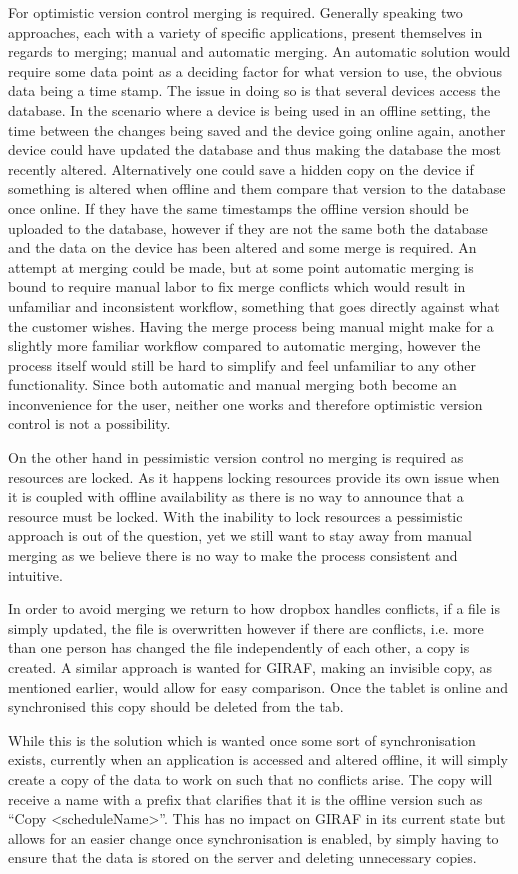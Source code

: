 For optimistic version control merging is required. 
Generally speaking two approaches, each with a variety of specific applications, present themselves in regards to merging; manual and automatic merging.
An automatic solution would require some data point as a deciding factor for what version to use, the obvious data being a time stamp.
The issue in doing so is that several devices access the database.
In the scenario where a device is being used in an offline setting, the time between the changes being saved and the device going online again, another device could have updated the database and thus making the database the most recently altered.
Alternatively one could save a hidden copy on the device if something is altered when offline and them compare that version to the database once online. 
If they have the same timestamps the offline version should be uploaded to the database, however if they are not the same both the database and the data on the device has been altered and some merge is required.
An attempt at merging could be made, but at some point automatic merging is bound to require manual labor to fix merge conflicts which would result in unfamiliar and inconsistent workflow, something that goes directly against what the customer wishes.
Having the merge process being manual might make for a slightly more familiar workflow compared to automatic merging, however the process itself would still be hard to simplify and feel unfamiliar to any other functionality.
Since both automatic and manual merging both become an inconvenience for the user, neither one works and therefore optimistic version control is not a possibility.

\bigskip
On the other hand in pessimistic version control no merging is required as resources are locked.
As it happens locking resources provide its own issue when it is coupled with offline availability as there is no way to announce that a resource must be locked.
With the inability to lock resources a pessimistic approach is out of the question, yet we still want to stay away from manual merging as we believe there is no way to make the process consistent and intuitive.

In order to avoid merging we return to how dropbox handles conflicts, if a file is simply updated, the file is overwritten however if there are conflicts, i.e. more than one person has changed the file independently of each other, a copy is created.
A similar approach is wanted for GIRAF, making an invisible copy, as mentioned earlier, would allow for easy comparison.
Once the tablet is online and synchronised this copy should be deleted from the tab.

\bigskip
While this is the solution which is wanted once some sort of synchronisation exists, currently when an application is accessed and altered offline, it will simply create a copy of the data to work on such that no conflicts arise.
The copy will receive a name with a prefix that clarifies that it is the offline version such as \enquote{Copy <scheduleName>}.
This has no impact on GIRAF in its current state but allows for an easier change once synchronisation is enabled, by simply having to ensure that the data is stored on the server and deleting unnecessary copies.
